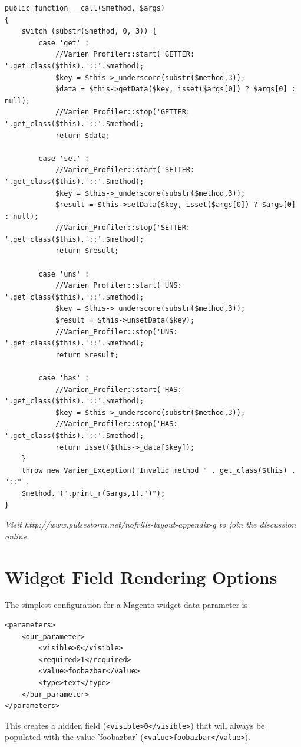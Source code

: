 \documentclass[oneside]{book}
\begin{document}
\begin{lstlisting}
public function __call($method, $args)
{
    switch (substr($method, 0, 3)) {
        case 'get' :
            //Varien_Profiler::start('GETTER: '.get_class($this).'::'.$method);
            $key = $this->_underscore(substr($method,3));
            $data = $this->getData($key, isset($args[0]) ? $args[0] : null);
            //Varien_Profiler::stop('GETTER: '.get_class($this).'::'.$method);
            return $data;

        case 'set' :
            //Varien_Profiler::start('SETTER: '.get_class($this).'::'.$method);
            $key = $this->_underscore(substr($method,3));
            $result = $this->setData($key, isset($args[0]) ? $args[0] : null);
            //Varien_Profiler::stop('SETTER: '.get_class($this).'::'.$method);
            return $result;

        case 'uns' :
            //Varien_Profiler::start('UNS: '.get_class($this).'::'.$method);
            $key = $this->_underscore(substr($method,3));
            $result = $this->unsetData($key);
            //Varien_Profiler::stop('UNS: '.get_class($this).'::'.$method);
            return $result;

        case 'has' :
            //Varien_Profiler::start('HAS: '.get_class($this).'::'.$method);
            $key = $this->_underscore(substr($method,3));
            //Varien_Profiler::stop('HAS: '.get_class($this).'::'.$method);
            return isset($this->_data[$key]);
    }
    throw new Varien_Exception("Invalid method " . get_class($this) . "::" . 
    $method."(".print_r($args,1).")");
}

\end{lstlisting}


\emph{Visit http://www.pulsestorm.net/nofrills-layout-appendix-g to join the discussion online.}
\chapter{Widget Field Rendering Options}
The simplest configuration for a Magento widget data parameter is

\begin{lstlisting}
<parameters>
    <our_parameter>
        <visible>0</visible>
        <required>1</required>
        <value>foobazbar</value>
        <type>text</type>
    </our_parameter>
</parameters>

\end{lstlisting}


This creates a hidden field (\footnotesize\texttt{\textless visible\textgreater 0\textless /visible\textgreater }\normalsize) that will always be populated with the value 'foobazbar' (\footnotesize\texttt{\textless value\textgreater foobazbar\textless /value\textgreater }\normalsize).
\end{document}
